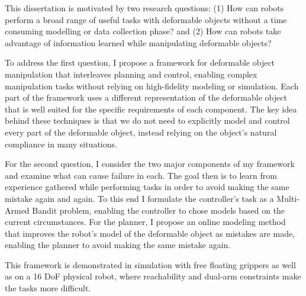 
This dissertation is motivated by two research questions: (1) How can robots perform a broad range of useful tasks with deformable objects without a time consuming modelling or data collection phase? and (2) How can robots take advantage of information learned while manipulating deformable objects?
        
To address the first question, I propose a framework for deformable object manipulation that interleaves planning and control, enabling complex manipulation tasks without relying on high-fidelity modeling or simulation. Each part of the framework uses a different representation of the deformable object that is well suited for the specific requirements of each component. The key idea behind these techniques is that we do not need to explicitly model and control every part of the deformable object, instead relying on the object's natural compliance in many situations. 

For the second question, I consider the two major components of my framework and examine what can cause failure in each. The goal then is to learn from experience gathered while performing tasks in order to avoid making the same mistake again and again. To this end I formulate the controller's task as a Multi-Armed Bandit problem, enabling the controller to chose models based on the current circumstances. For the planner, I propose an online modeling method that improves the robot's model of the deformable object as mistakes are made, enabling the planner to avoid making the same mistake again.

This framework is demonstrated in simulation with free floating grippers as well as on a 16 DoF physical robot, where reachability and dual-arm constraints make the tasks more difficult.